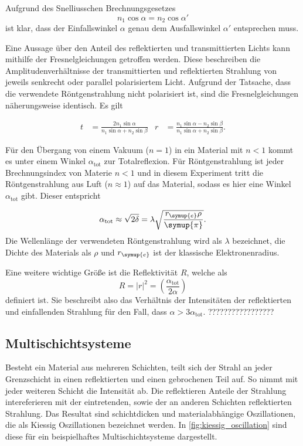 Aufgrund des Snelliusschen Brechnungsgesetzes
\begin{equation*}
    n_1 \cos \alpha = n_2 \cos \alpha'
\end{equation*}
ist klar, dass der Einfallswinkel $\alpha$ genau dem Ausfallswinkel $\alpha'$ entsprechen muss.

Eine Aussage über den Anteil des reflektierten und transmittierten Lichts kann mithilfe der Fresnelgleichungen getroffen werden. Diese beschreiben die Amplitudenverhältnisse der 
transmittierten und reflektierten Strahlung von jeweils senkrecht oder parallel polarisiertem Licht. Aufgrund der Tatsache, dass die verwendete Röntgenstrahlung nicht polarisiert ist,
sind die Fresnelgleichungen näherungsweise identisch. Es gilt

\begin{align*}
    t &= \frac{2n_1\sin\alpha}{n_1\sin\alpha + n_2 \sin\beta} & r &= \frac{n_1\sin\alpha - n_2\sin\beta}{n_1\sin\alpha+n_2 \sin\beta}.
\end{align*}

Für den Übergang von einem Vakuum ($n=1$) in ein Material mit $n<1$ kommt es unter einem Winkel $\alpha_{\text{tot}}$ zur Totalreflexion. Für Röntgenstrahlung ist jeder Brechnungsindex 
von Materie $n<1$ und in diesem Experiment tritt die Röntgenstrahlung aus Luft ($n \approx 1$) auf das Material, sodass es hier eine Winkel $\alpha_{\text{tot}}$ gibt. Dieser entspricht

\begin{equation}
    \alpha_{\text{tot}} \approx \sqrt{2\delta} = \lambda \sqrt{\frac{r_{\symup{e}}\rho}{\symup{\pi}}}.
    \label{eq:alpha_tot}
\end{equation}
Die Wellenlänge der verwendeten Röntgenstrahlung wird als $\lambda$ bezeichnet, die Dichte des Materials als $\rho$ und $r_{\symup{e}}$ ist der klassische Elektronenradius.

Eine weitere wichtige Größe ist die Reflektivität $R$, welche als
\begin{equation}
    R = |{r}|^2 = \left(\frac{\alpha_{\text{tot}}}{2\alpha}\right)
    \label{eq:Reflektivitaet}
\end{equation}
definiert ist. Sie beschreibt also das Verhältnis der Intensitäten der reflektierten und einfallenden Strahlung für den Fall, dass $\alpha > 3 \alpha_{\text{tot}}$. ?????????????????

\subsection{Multischichtsysteme}
Besteht ein Material aus mehreren Schichten, teilt sich der Strahl an jeder Grenzschicht in einen reflektierten und einen gebrochenen Teil auf. So nimmt mit jeder weiteren Schicht
die Intensität ab. Die reflektieren Anteile der Strahlung intereferieren mit der eintretenden, sowie der an anderen Schichten reflektierten Strahlung. Das Resultat sind schichtdicken
und materialabhängige Oszillationen, die als Kiessig Oszillationen bezeichnet werden. In \autoref{fig:kiessig_oscillation} sind diese für ein beispielhaftes Multischichtsysteme dargestellt.

